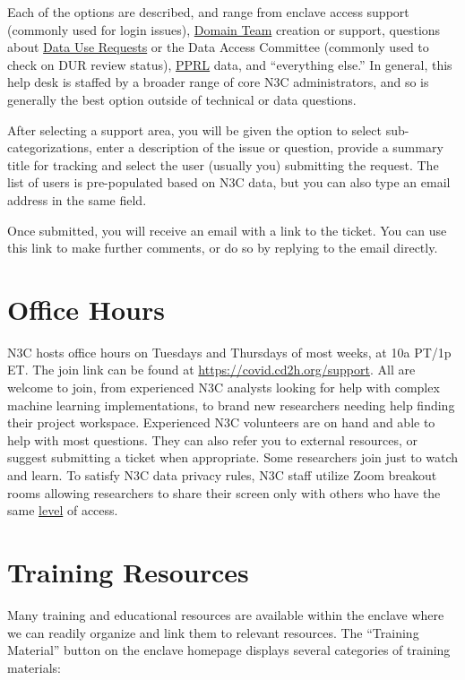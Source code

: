 \documentclass[
  letterpaper,
  DIV=11,
  numbers=noendperiod]{scrreprt}
\begin{document}
Each of the options are described, and range from enclave access support
(commonly used for login issues),
\protect\hyperlink{domain-teams}{Domain Team} creation or support,
questions about \protect\hyperlink{data-use-requests}{Data Use Requests}
or the Data Access Committee (commonly used to check on DUR review
status), \protect\hyperlink{pprl-data}{PPRL} data, and ``everything
else.'' In general, this help desk is staffed by a broader range of core
N3C administrators, and so is generally the best option outside of
technical or data questions.

After selecting a support area, you will be given the option to select
sub-categorizations, enter a description of the issue or question,
provide a summary title for tracking and select the user (usually you)
submitting the request. The list of users is pre-populated based on N3C
data, but you can also type an email address in the same field.

Once submitted, you will receive an email with a link to the ticket. You
can use this link to make further comments, or do so by replying to the
email directly.

\hypertarget{sec-support-office}{%
\section{Office Hours}\label{sec-support-office}}

N3C hosts office hours on Tuesdays and Thursdays of most weeks, at 10a
PT/1p ET. The join link can be found at
\url{https://covid.cd2h.org/support}. All are welcome to join, from
experienced N3C analysts looking for help with complex machine learning
implementations, to brand new researchers needing help finding their
project workspace. Experienced N3C volunteers are on hand and able to
help with most questions. They can also refer you to external resources,
or suggest submitting a ticket when appropriate. Some researchers join
just to watch and learn. To satisfy N3C data privacy rules, N3C staff
utilize Zoom breakout rooms allowing researchers to share their screen
only with others who have the same
\protect\hyperlink{data-levels}{level} of access.

\hypertarget{sec-support-training}{%
\section{Training Resources}\label{sec-support-training}}

Many training and educational resources are available within the enclave
where we can readily organize and link them to relevant resources. The
``Training Material'' button on the enclave homepage displays several
categories of training materials:
\end{document}
